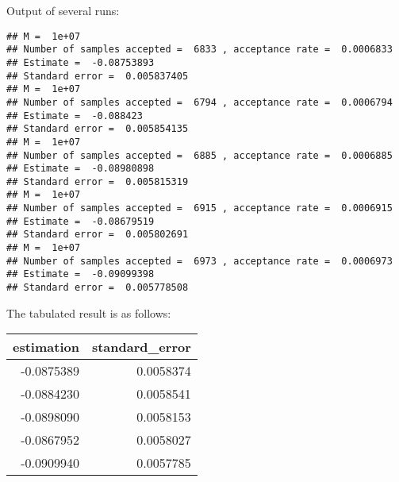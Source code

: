 \begin{knitrout}
\begin{kframe}
\begin{alltt}
 \hlkwb{=} 
 \hlkwb{=} 
 \hlkwb{=} \hlopt{/}\hlstd{(}
 \hlkwb{=} \hlopt{/}

\hlstd{(}\hlstd{)}
\hlstd{(}\hlstd{,}\hlstd{)}
\hlstd{(}\hlstd{)}
\hlstd{(}\hlstd{)}
\end{alltt}
\end{kframe}
\end{knitrout}
Output of several runs:
\begin{knitrout}
\color{fgcolor}\begin{kframe}
\begin{verbatim}
## M =  1e+07 
## Number of samples accepted =  6833 , acceptance rate =  0.0006833 
## Estimate =  -0.08753893 
## Standard error =  0.005837405
## M =  1e+07 
## Number of samples accepted =  6794 , acceptance rate =  0.0006794 
## Estimate =  -0.088423 
## Standard error =  0.005854135
## M =  1e+07 
## Number of samples accepted =  6885 , acceptance rate =  0.0006885 
## Estimate =  -0.08980898 
## Standard error =  0.005815319
## M =  1e+07 
## Number of samples accepted =  6915 , acceptance rate =  0.0006915 
## Estimate =  -0.08679519 
## Standard error =  0.005802691
## M =  1e+07 
## Number of samples accepted =  6973 , acceptance rate =  0.0006973 
## Estimate =  -0.09099398 
## Standard error =  0.005778508
\end{verbatim}
\end{kframe}
\end{knitrout}
The tabulated result is as follows:\\
\begin{center}
\begin{knitrout}
\color{fgcolor}
\begin{tabular}{r|r}
\hline
estimation & standard\_error\\
\hline
-0.0875389 & 0.0058374\\
\hline
-0.0884230 & 0.0058541\\
\hline
-0.0898090 & 0.0058153\\
\hline
-0.0867952 & 0.0058027\\
\hline
-0.0909940 & 0.0057785\\
\hline
\end{tabular}


\end{knitrout}
\end{center}
